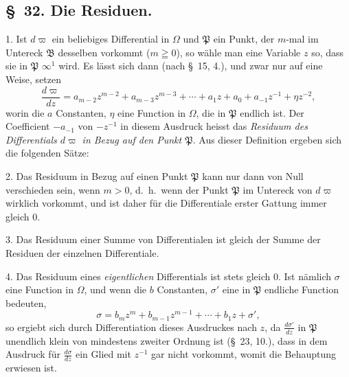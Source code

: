 \documentclass{article}
\begin{document}
\subsection*{§~32. Die Residuen.}

1. Ist $d\varpi$ ein beliebiges Differential in $\Omega$ und $\mathfrak{P}$ ein Punkt, der $m$-mal im Untereck $\mathfrak{B}$ desselben vorkommt ($m \geqq 0$), so wähle man eine Variable $z$ so, dass sie in $\mathfrak{P}$ $\infty^{1}$ wird. Es lässt sich dann (nach §~15, 4.), und zwar nur auf eine Weise, setzen
\[ \frac{d\varpi}{dz} = a_{m-2}z^{m-2}+a_{m-3}z^{m-3}+\cdots+a_{1}z+a_{0}+a_{-1}z^{-1}+\eta z^{-2}, \tag{1.} \]
worin die $a$ Constanten, $\eta$ eine Function in $\Omega$, die in $\mathfrak{P}$ endlich ist. Der Coefficient $-a_{-1}$ von $-z^{-1}$ in diesem Ausdruck heisst das \emph{Residuum des Differentials $d\varpi$ in Bezug auf den Punkt $\mathfrak{P}$}. Aus dieser Definition ergeben sich die folgenden Sätze:


2. Das Residuum in Bezug auf einen Punkt $\mathfrak{P}$ kann nur dann von Null verschieden sein, wenn $m > 0$, d.\ h.\ wenn der Punkt $\mathfrak{P}$ im Untereck von $d\varpi$ wirklich vorkommt, und ist daher für die Differentiale erster Gattung immer gleich 0.

3. Das Residuum einer Summe von Differentialen ist gleich der Summe der Residuen der einzelnen Differentiale.

4. Das Residuum eines \emph{eigentlichen} Differentials ist stets gleich 0. Ist nämlich $\sigma$ eine Function in $\Omega$, und wenn die $b$ Constanten, $\sigma'$ eine in $\mathfrak{P}$ endliche Function bedeuten,
\[ \sigma = b_{m}z^{m}+b_{m-1}z^{m-1}+\cdots+b_{1}z+\sigma', \]
so ergiebt sich durch Differentiation dieses Ausdruckes nach $z$, da $\frac{d\sigma'}{dz}$ in $\mathfrak{P}$ unendlich klein von mindestens zweiter Ordnung ist (§~23, 10.), dass in dem Ausdruck für $\frac{d\sigma}{dz}$ ein Glied mit $z^{-1}$ gar nicht vorkommt, womit die Behauptung erwiesen ist.
\end{document}
